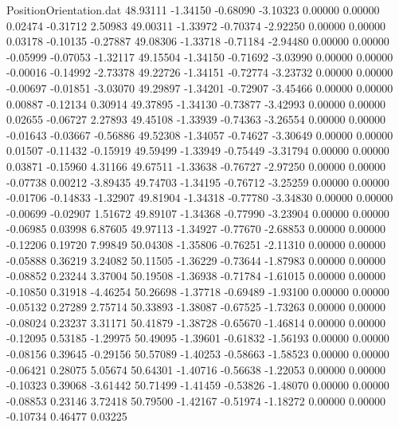 \begin{filecontents}{PositionOrientation.dat}
  48.93111   -1.34150   -0.68090    -3.10323    0.00000    0.00000    0.02474   -0.31712    2.50983
  49.00311   -1.33972   -0.70374    -2.92250    0.00000    0.00000    0.03178   -0.10135   -0.27887
  49.08306   -1.33718   -0.71184    -2.94480    0.00000    0.00000   -0.05999   -0.07053   -1.32117
  49.15504   -1.34150   -0.71692    -3.03990    0.00000    0.00000   -0.00016   -0.14992   -2.73378
  49.22726   -1.34151   -0.72774    -3.23732    0.00000    0.00000   -0.00697   -0.01851   -3.03070
  49.29897   -1.34201   -0.72907    -3.45466    0.00000    0.00000    0.00887   -0.12134    0.30914
  49.37895   -1.34130   -0.73877    -3.42993    0.00000    0.00000    0.02655   -0.06727    2.27893
  49.45108   -1.33939   -0.74363    -3.26554    0.00000    0.00000   -0.01643   -0.03667   -0.56886
  49.52308   -1.34057   -0.74627    -3.30649    0.00000    0.00000    0.01507   -0.11432   -0.15919
  49.59499   -1.33949   -0.75449    -3.31794    0.00000    0.00000    0.03871   -0.15960    4.31166
  49.67511   -1.33638   -0.76727    -2.97250    0.00000    0.00000   -0.07738    0.00212   -3.89435
  49.74703   -1.34195   -0.76712    -3.25259    0.00000    0.00000   -0.01706   -0.14833   -1.32907
  49.81904   -1.34318   -0.77780    -3.34830    0.00000    0.00000   -0.00699   -0.02907    1.51672
  49.89107   -1.34368   -0.77990    -3.23904    0.00000    0.00000   -0.06985    0.03998    6.87605
  49.97113   -1.34927   -0.77670    -2.68853    0.00000    0.00000   -0.12206    0.19720    7.99849
  50.04308   -1.35806   -0.76251    -2.11310    0.00000    0.00000   -0.05888    0.36219    3.24082
  50.11505   -1.36229   -0.73644    -1.87983    0.00000    0.00000   -0.08852    0.23244    3.37004
  50.19508   -1.36938   -0.71784    -1.61015    0.00000    0.00000   -0.10850    0.31918   -4.46254
  50.26698   -1.37718   -0.69489    -1.93100    0.00000    0.00000   -0.05132    0.27289    2.75714
  50.33893   -1.38087   -0.67525    -1.73263    0.00000    0.00000   -0.08024    0.23237    3.31171
  50.41879   -1.38728   -0.65670    -1.46814    0.00000    0.00000   -0.12095    0.53185   -1.29975
  50.49095   -1.39601   -0.61832    -1.56193    0.00000    0.00000   -0.08156    0.39645   -0.29156
  50.57089   -1.40253   -0.58663    -1.58523    0.00000    0.00000   -0.06421    0.28075    5.05674
  50.64301   -1.40716   -0.56638    -1.22053    0.00000    0.00000   -0.10323    0.39068   -3.61442
  50.71499   -1.41459   -0.53826    -1.48070    0.00000    0.00000   -0.08853    0.23146    3.72418
  50.79500   -1.42167   -0.51974    -1.18272    0.00000    0.00000   -0.10734    0.46477    0.03225

\end{filecontents}
